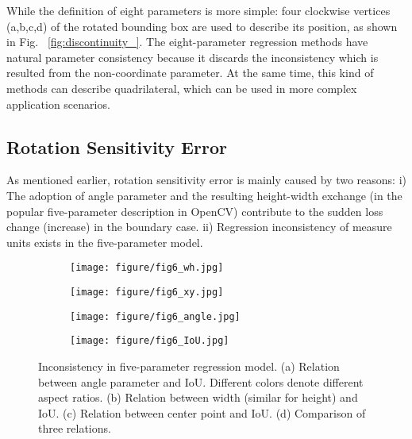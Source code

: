 \documentclass[10pt,twocolumn,letterpaper]{article}
\begin{document}
While the definition of eight parameters is more simple: four clockwise vertices (a,b,c,d) of the rotated bounding box are used to describe its position, as shown in Fig. ~\ref{fig:discontinuity_}. The eight-parameter regression methods have natural parameter consistency because it discards the inconsistency which is resulted from the non-coordinate parameter. At the same time, this kind of methods can describe quadrilateral, which can be used in more complex application scenarios.

\subsection{Rotation Sensitivity Error}
As mentioned earlier, rotation sensitivity error is mainly caused by two reasons: i) The adoption of angle parameter and the resulting height-width exchange (in the popular five-parameter description in OpenCV) contribute to the sudden loss change (increase) in the boundary case. ii) Regression inconsistency of measure units exists in the five-parameter model.
\begin{figure}[t]
    \centering
    \begin{subfigure}{.235\textwidth}
        \centering    \texttt{[image: figure/fig6\_wh.jpg]}
        \vspace{-5pt}
        \caption{}
        \label{fig:2_1}
    \end{subfigure}
    \begin{subfigure}{.235\textwidth}
        \centering    \texttt{[image: figure/fig6\_xy.jpg]}
        \vspace{-5pt}
        \caption{}
        \label{fig:2_2}
    \end{subfigure}
    \begin{subfigure}{.235\textwidth}
        \centering    \texttt{[image: figure/fig6\_angle.jpg]}
        \vspace{-5pt}
        \caption{}
        \label{fig:2_3}
    \end{subfigure}
    \begin{subfigure}{.235\textwidth}
        \centering    \texttt{[image: figure/fig6\_IoU.jpg]}
        \vspace{-5pt}
        \caption{}
        \label{fig:2_4}
    \end{subfigure}
    \vspace{-10pt}
    \caption{Inconsistency in five-parameter regression model. (a) Relation between angle parameter and IoU. Different colors denote different aspect ratios. (b) Relation between width (similar for height) and IoU. (c) Relation between center point and IoU. (d) Comparison of three relations.}
    \label{fig:inconsistency}
\end{figure}
\end{document}
